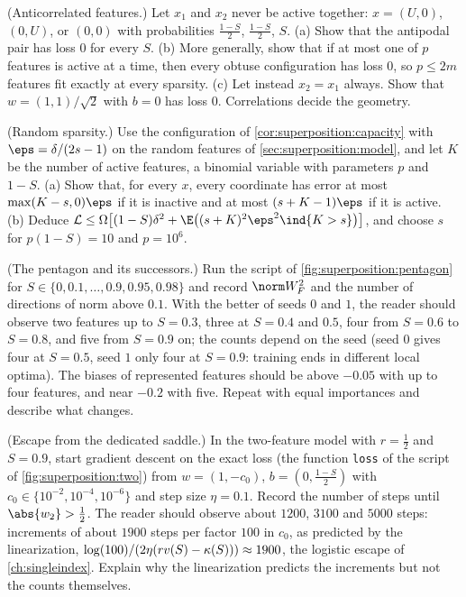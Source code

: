 \begin{refsection}
\begin{exercises}
\item \variation (Anticorrelated features.) Let $x_1$ and $x_2$ never be active together: $x=(U,0)$, $(0,U)$, or $(0,0)$ with probabilities $\frac{1-S}2$, $\frac{1-S}2$, $S$. (a) Show that the antipodal pair has loss $0$ for every $S$. (b) More generally, show that if at most one of $p$ features is active at a time, then every obtuse configuration has loss $0$, so $p\le2m$ features fit exactly at every sparsity. (c) Let instead $x_2=x_1$ always. Show that $w=(1,1)/\sqrt2$ with $b=0$ has loss $0$. Correlations decide the geometry. \label{ex:superposition:anticorrelated}

\item \variation\hard (Random sparsity.) Use the configuration of \cref{cor:superposition:capacity} with $\eps=\delta/(2s-1)$ on the random features of \cref{sec:superposition:model}, and let $K$ be the number of active features, a binomial variable with parameters $p$ and $1-S$. (a) Show that, for every $x$, every coordinate has error at most $\max(K-s,0)\eps$ if it is inactive and at most $(s+K-1)\eps$ if it is active. (b) Deduce $\Loss\le\supOmega\bigl[(1-S)\delta^2+\E\bigl((s+K)^2\eps^2\ind\{K>s\}\bigr)\bigr]$, and choose $s$ for $p(1-S)=10$ and $p=10^6$. \label{ex:superposition:random}

\item \simulation (The pentagon and its successors.) Run the script of \cref{fig:superposition:pentagon} for $S\in\{0,0.1,\dots,0.9,0.95,0.98\}$ and record $\norm W_F^2$ and the number of directions of norm above $0.1$. With the better of seeds $0$ and $1$, the reader should observe two features up to $S=0.3$, three at $S=0.4$ and $0.5$, four from $S=0.6$ to $S=0.8$, and five from $S=0.9$ on; the counts depend on the seed (seed $0$ gives four at $S=0.5$, seed $1$ only four at $S=0.9$: training ends in different local optima). The biases of represented features should be above $-0.05$ with up to four features, and near $-0.2$ with five. Repeat with equal importances and describe what changes. \label{ex:superposition:pentasim}

\item \simulation (Escape from the dedicated saddle.) In the two-feature model with $r=\frac12$ and $S=0.9$, start gradient descent on the exact loss (the function \texttt{loss} of the script of \cref{fig:superposition:two}) from $w=(1,-c_0)$, $b=(0,\frac{1-S}2)$ with $c_0\in\{10^{-2},10^{-4},10^{-6}\}$ and step size $\eta=0.1$. Record the number of steps until $\abs{w_2}>\frac12$. The reader should observe about $1200$, $3100$ and $5000$ steps: increments of about $1900$ steps per factor $100$ in $c_0$, as predicted by the linearization, $\log(100)/(2\eta(rv(S)-\kappa(S)))\approx1900$, the logistic escape of \cref{ch:singleindex}. Explain why the linearization predicts the increments but not the counts themselves. \label{ex:superposition:escape}


\end{exercises}
\end{refsection}
